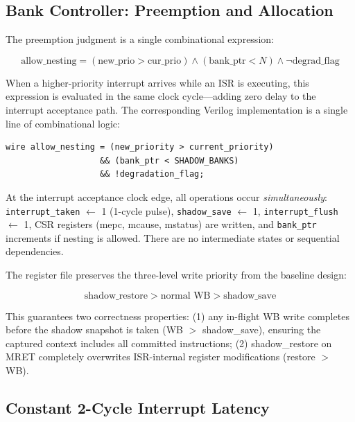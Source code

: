 \documentclass[conference]{IEEEtran}
\begin{document}
\subsection{Bank Controller: Preemption and Allocation}

The preemption judgment is a single combinational expression:

\begin{equation}
\text{allow\_nesting} = (\text{new\_prio} > \text{cur\_prio}) \land (\text{bank\_ptr} < N) \land \lnot\text{degrad\_flag}
\label{eq:preempt}
\end{equation}

When a higher-priority interrupt arrives while an ISR is executing, this expression is evaluated in the same clock cycle---adding zero delay to the interrupt acceptance path.
The corresponding Verilog implementation is a single line of combinational logic:

\begin{verbatim}
wire allow_nesting = (new_priority > current_priority)
                   && (bank_ptr < SHADOW_BANKS)
                   && !degradation_flag;
\end{verbatim}

At the interrupt acceptance clock edge, all operations occur \emph{simultaneously}: \texttt{interrupt\_taken} $\leftarrow$ 1 (1-cycle pulse), \texttt{shadow\_save} $\leftarrow$ 1, \texttt{interrupt\_flush} $\leftarrow$ 1, CSR registers (mepc, mcause, mstatus) are written, and \texttt{bank\_ptr} increments if nesting is allowed.
There are no intermediate states or sequential dependencies.

The register file preserves the three-level write priority from the baseline design:

\begin{equation}
\text{shadow\_restore} > \text{normal WB} > \text{shadow\_save}
\label{eq:priority}
\end{equation}

This guarantees two correctness properties: (1) any in-flight WB write completes before the shadow snapshot is taken (WB $>$ shadow\_save), ensuring the captured context includes all committed instructions; (2) shadow\_restore on MRET completely overwrites ISR-internal register modifications (restore $>$ WB).

\subsection{Constant 2-Cycle Interrupt Latency}
\end{document}
